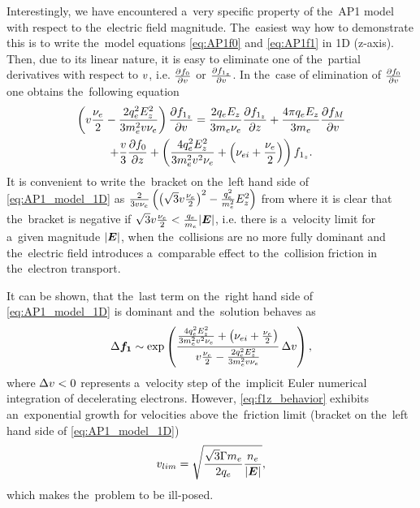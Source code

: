 Interestingly, we have encountered a~very specific property of the~AP1 model
with respect to the~electric field magnitude. The~easiest way how to 
demonstrate this is to write the~model equations \eqref{eq:AP1f0} and 
\eqref{eq:AP1f1} in 1D (z-axis). Then, due to its linear nature, it is easy 
to eliminate one of the~partial derivatives with respect to $v$, i.e. 
$\frac{\partial{f_0}}{\partial{v}}$ or $\frac{\partial{f_{1_z}}}{\partial{v}}$. 
In the~case of elimination of $\frac{\partial{f_0}}{\partial{v}}$ 
one obtains the~following equation
\begin{multline}
  \left(v\frac{\nu_{e}}{2} - \frac{2q_e^2E_z^2}{3m_e^2v\nu_{e}}\right) 
  \frac{\partial{f_{1_z}}}{\partial{v}} 
  =
  \frac{2q_eE_z}{3m_e\nu_{e}}\frac{\partial{f_{1_z}}}{\partial{z}}  
  + \frac{4\pi q_eE_z}{3m_e}\frac{\partial{f_M}}{\partial{v}} \\
  + \frac{v}{3}\frac{\partial{f_0}}{\partial{z}} 
  + \left(\frac{4q_e^2E_z^2}{3m_e^2v^2\nu_{e}}
  + \left(\nu_{ei} + \frac{\nu_{e}}{2}\right) \right)f_{1_z} .
  \label{eq:AP1_model_1D}
\end{multline}
It is convenient to write the~bracket on the~left hand side of 
\eqref{eq:AP1_model_1D} as
$\frac{2}{3v\nu_{e}} 
\left(\left(\sqrt{3}v\frac{\nu_{e}}{2}\right)^2 
- \frac{q_e^2}{m_e^2}E_z^2\right)$
from where it is clear that the~bracket is negative if 
$\sqrt{3}v\frac{\nu_{e}}{2} < \frac{q_e}{m_e}|\boldsymbol{E}|$, 
i.e. there is a~velocity limit for a~given magnitude $|\boldsymbol{E}|$, 
when the~collisions are no more fully dominant and the~electric field 
introduces a~comparable effect to the~collision friction in 
the~electron transport.

It can be shown, that the~last term on the~right hand side of 
\eqref{eq:AP1_model_1D} is dominant and the~solution behaves as 
\begin{equation}
  \Delta \boldsymbol{f_1} \sim \exp\left(\frac{\frac{4q_e^2E_z^2}{3m_e^2v^2\nu_{e}}
  + \left(\nu_{ei} + \frac{\nu_{e}}{2}\right)}
  {v\frac{\nu_{e}}{2} - \frac{2q_e^2E_z^2}{3m_e^2v\nu_{e}}}\, 
  \Delta v\right) ,
  \label{eq:f1z_behavior}
\end{equation}
where $\Delta v < 0$ represents a~velocity step of the~implicit Euler
numerical integration of decelerating electrons.
However, \eqref{eq:f1z_behavior} exhibits an~exponential growth 
for velocities above the~friction limit (bracket on the~left hand side of 
\eqref{eq:AP1_model_1D})
\begin{equation}
  v_{lim}  = \sqrt{\frac{\sqrt{3}\Gamma m_e}{2q_e}\frac{n_e}{|\boldsymbol{E}|}} ,
  \label{eq:v_limit}
\end{equation}
which makes the~problem to be ill-posed.

